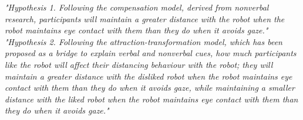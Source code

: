 \textit{"Hypothesis 1. Following the compensation model, derived from
nonverbal research, participants will maintain a greater distance
with the robot when the robot maintains eye contact with them
than they do when it avoids gaze."}\\

\textit{"Hypothesis 2. Following the attraction-transformation model,
which has been proposed as a bridge to explain verbal and
nonverbal cues, how much participants like the robot will affect
their distancing behaviour with the robot; they will maintain a
greater distance with the disliked robot when the robot maintains
eye contact with them than they do when it avoids gaze, while
maintaining a smaller distance with the liked robot when the robot
maintains eye contact with them than they do when it avoids gaze."}\\
